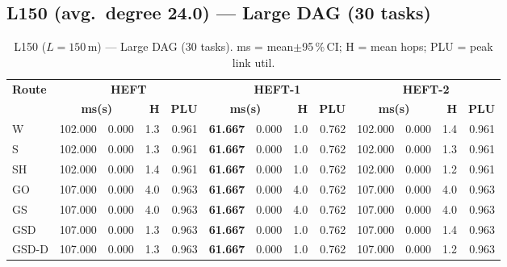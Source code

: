 \documentclass[11pt]{article}
\newcommand{\win}[1]{\textcolor{green!50!black}{\textbf{#1}}}
\newcommand{\bad}[1]{\textcolor{red!70!black}{#1}}
\begin{document}
\subsection{L150 (avg.\ degree 24.0) --- Large DAG (30 tasks)}
\begin{table}[H]\centering\small
\begin{tabular}{l r@{$\pm$}l r r r@{$\pm$}l r r r@{$\pm$}l r r}
\toprule
\textbf{Route} & \multicolumn{4}{c}{\textbf{HEFT}} & \multicolumn{4}{c}{\textbf{HEFT-1}} & \multicolumn{4}{c}{\textbf{HEFT-2}} \\
\cmidrule(lr){2-5}\cmidrule(lr){6-9}\cmidrule(lr){10-13}
& \multicolumn{2}{c}{\textbf{ms(s)}} & \textbf{H} & \textbf{PLU}& \multicolumn{2}{c}{\textbf{ms(s)}} & \textbf{H} & \textbf{PLU}& \multicolumn{2}{c}{\textbf{ms(s)}} & \textbf{H} & \textbf{PLU} \\
\midrule
  W & 102.000 & 0.000 & 1.3 & 0.961 & \win{61.667} & 0.000 & 1.0 & 0.762 & 102.000 & 0.000 & 1.4 & 0.961 \\
  S & 102.000 & 0.000 & 1.3 & 0.961 & \win{61.667} & 0.000 & 1.0 & 0.762 & 102.000 & 0.000 & 1.3 & 0.961 \\
  SH & 102.000 & 0.000 & 1.4 & 0.961 & \win{61.667} & 0.000 & 1.0 & 0.762 & 102.000 & 0.000 & 1.2 & 0.961 \\
  GO & \bad{107.000} & 0.000 & 4.0 & 0.963 & \win{61.667} & 0.000 & 4.0 & 0.762 & \bad{107.000} & 0.000 & 4.0 & 0.963 \\
  GS & \bad{107.000} & 0.000 & 4.0 & 0.963 & \win{61.667} & 0.000 & 4.0 & 0.762 & \bad{107.000} & 0.000 & 4.0 & 0.963 \\
  GSD & \bad{107.000} & 0.000 & 1.3 & 0.963 & \win{61.667} & 0.000 & 1.0 & 0.762 & \bad{107.000} & 0.000 & 1.4 & 0.963 \\
  GSD-D & \bad{107.000} & 0.000 & 1.3 & 0.963 & \win{61.667} & 0.000 & 1.0 & 0.762 & \bad{107.000} & 0.000 & 1.2 & 0.963 \\
\bottomrule\end{tabular}
\caption{L150 ($L=150$\,m) --- Large DAG (30 tasks). ms = mean$\pm$95\,\%\,CI; H = mean hops; PLU = peak link util.}
\end{table}
\end{document}
